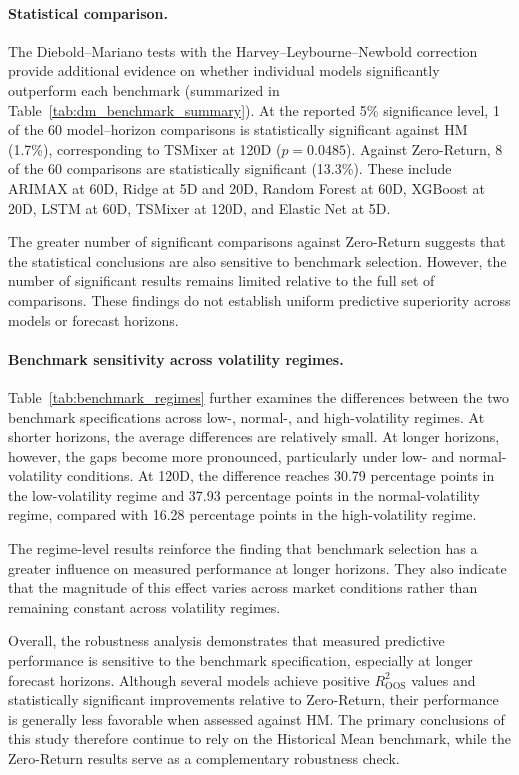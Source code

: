 \documentclass[12pt,twoside]{ord}
\begin{document}
\paragraph{Statistical comparison.} The Diebold--Mariano tests with the Harvey--Leybourne--Newbold correction provide additional evidence on whether individual models significantly outperform each benchmark (summarized in Table~\ref{tab:dm_benchmark_summary}). At the reported 5\% significance level, 1 of the 60 model--horizon comparisons is statistically significant against HM (1.7\%), corresponding to TSMixer at 120D (\(p=0.0485\)). Against Zero-Return, 8 of the 60 comparisons are statistically significant (13.3\%). These include ARIMAX at 60D, Ridge at 5D and 20D, Random Forest at 60D, XGBoost at 20D, LSTM at 60D, TSMixer at 120D, and Elastic Net at 5D.

The greater number of significant comparisons against Zero-Return suggests that the statistical conclusions are also sensitive to benchmark selection. However, the number of significant results remains limited relative to the full set of comparisons. These findings do not establish uniform predictive superiority across models or forecast horizons.

\paragraph{Benchmark sensitivity across volatility regimes.} Table~\ref{tab:benchmark_regimes} further examines the differences between the two benchmark specifications across low-, normal-, and high-volatility regimes. At shorter horizons, the average differences are relatively small. At longer horizons, however, the gaps become more pronounced, particularly under low- and normal-volatility conditions. At 120D, the difference reaches 30.79 percentage points in the low-volatility regime and 37.93 percentage points in the normal-volatility regime, compared with 16.28 percentage points in the high-volatility regime.

The regime-level results reinforce the finding that benchmark selection has a greater influence on measured performance at longer horizons. They also indicate that the magnitude of this effect varies across market conditions rather than remaining constant across volatility regimes.

Overall, the robustness analysis demonstrates that measured predictive performance is sensitive to the benchmark specification, especially at longer forecast horizons. Although several models achieve positive \(R^2_{\mathrm{OOS}}\) values and statistically significant improvements relative to Zero-Return, their performance is generally less favorable when assessed against HM. The primary conclusions of this study therefore continue to rely on the Historical Mean benchmark, while the Zero-Return results serve as a complementary robustness check.
\end{document}

